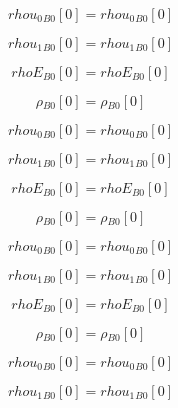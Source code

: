 \documentclass{article}
\begin{document}
\begin{dmath}{rhou_{0}{_{B0}}}[{0}] = {rhou_{0}{_{B0}}}[{0}]\end{dmath}

\begin{dmath}{rhou_{1}{_{B0}}}[{0}] = {rhou_{1}{_{B0}}}[{0}]\end{dmath}

\begin{dmath}{rhoE{_{B0}}}[{0}] = {rhoE{_{B0}}}[{0}]\end{dmath}

\begin{dmath}{\rho{_{B0}}}[{0}] = {\rho{_{B0}}}[{0}]\end{dmath}

\begin{dmath}{rhou_{0}{_{B0}}}[{0}] = {rhou_{0}{_{B0}}}[{0}]\end{dmath}

\begin{dmath}{rhou_{1}{_{B0}}}[{0}] = {rhou_{1}{_{B0}}}[{0}]\end{dmath}

\begin{dmath}{rhoE{_{B0}}}[{0}] = {rhoE{_{B0}}}[{0}]\end{dmath}

\begin{dmath}{\rho{_{B0}}}[{0}] = {\rho{_{B0}}}[{0}]\end{dmath}

\begin{dmath}{rhou_{0}{_{B0}}}[{0}] = {rhou_{0}{_{B0}}}[{0}]\end{dmath}

\begin{dmath}{rhou_{1}{_{B0}}}[{0}] = {rhou_{1}{_{B0}}}[{0}]\end{dmath}

\begin{dmath}{rhoE{_{B0}}}[{0}] = {rhoE{_{B0}}}[{0}]\end{dmath}

\begin{dmath}{\rho{_{B0}}}[{0}] = {\rho{_{B0}}}[{0}]\end{dmath}

\begin{dmath}{rhou_{0}{_{B0}}}[{0}] = {rhou_{0}{_{B0}}}[{0}]\end{dmath}

\begin{dmath}{rhou_{1}{_{B0}}}[{0}] = {rhou_{1}{_{B0}}}[{0}]\end{dmath}
\end{document}
